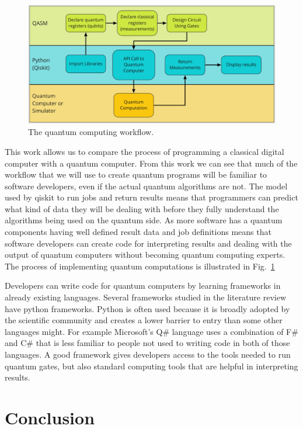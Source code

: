 \documentclass{article}
\begin{document}
\begin{figure}[htbp]
    \centerline{\includegraphics[width=\textwidth]{qworkflow.png}}
    \caption{The quantum computing workflow.}
    \label{fig:workflow}
\end{figure}

This work allows us to compare the process of programming a classical digital computer with a quantum computer. From this work we can see that much of the workflow that we will use to create quantum programs will be familiar to software developers, even if the actual quantum algorithms are not. The model used by qiskit to run jobs and return results means that programmers can predict what kind of data they will be dealing with before they fully understand the algorithms being used on the quantum side. As more software has a quantum components having well defined result data and job definitions means that software developers can create code for interpreting results and dealing with the output of quantum computers without becoming quantum computing experts. The process of implementing quantum computations is illustrated in Fig.~\ref{fig:workflow}

Developers can write code for quantum computers by learning frameworks in already existing languages. Several frameworks studied in the literature review have python frameworks. Python is often used because it is broadly adopted by the scientific community and creates a lower barrier to entry than some other languages might. For example Microsoft's Q\# language uses a combination of F\# and C\# that is less familiar to people not used to writing code in both of those languages. A good framework gives developers access to the tools needed to run quantum gates, but also standard computing tools that are helpful in interpreting results. 

\section*{Conclusion}
\end{document}
